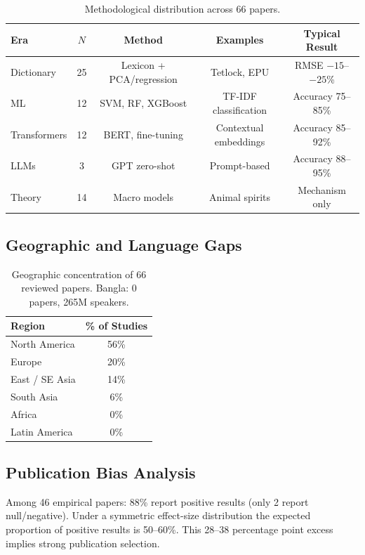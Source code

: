 \documentclass[11pt]{article}
\begin{document}
\begin{table}[h]
\centering
\begin{tabular}{lcccc}
\toprule
Era & \(N\) & Method & Examples & Typical Result \\
\midrule
Dictionary        & 25 & Lexicon + PCA/regression & Tetlock, EPU        & RMSE \(-15\)--\(-25\)\% \\
ML                & 12 & SVM, RF, XGBoost         & TF-IDF classification & Accuracy 75--85\%  \\
Transformers      & 12 & BERT, fine-tuning         & Contextual embeddings & Accuracy 85--92\%  \\
LLMs              &  3 & GPT zero-shot             & Prompt-based          & Accuracy 88--95\%  \\
Theory            & 14 & Macro models              & Animal spirits        & Mechanism only    \\
\bottomrule
\end{tabular}
\caption{Methodological distribution across 66 papers.}
\end{table}

\subsection{Geographic and Language Gaps}

\begin{table}[h]
\centering
\begin{tabular}{lc}
\toprule
Region & \% of Studies \\
\midrule
North America     & 56\% \\
Europe            & 20\% \\
East / SE Asia    & 14\% \\
South Asia        &  6\% \\
Africa            &  0\% \\
Latin America     &  0\% \\
\bottomrule
\end{tabular}
\caption{Geographic concentration of 66 reviewed papers. Bangla: 0 papers, 265M speakers.}
\end{table}

\subsection{Publication Bias Analysis}

Among 46 empirical papers: 88\% report positive results (only 2 report null/negative). Under a symmetric effect-size distribution the expected proportion of positive results is 50--60\%. This 28--38 percentage point excess implies strong publication selection.
\end{document}
